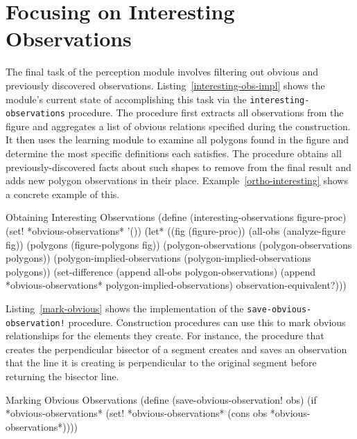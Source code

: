 \section{Focusing on Interesting Observations}

The final task of the perception module involves filtering out obvious
and previously discovered observations.
Listing~\ref{interesting-obs-impl} shows the module's current state of
accomplishing this task via the \texttt{interesting-observations}
procedure. The procedure first extracts all observations from the
figure and aggregates a list of obvious relations specified during the
construction. It then uses the learning module to examine all polygons
found in the figure and determine the most specific definitions each
satisfies. The procedure obtains all previously-discovered facts about
such shapes to remove from the final result and adds new polygon
observations in their place. Example~\ref{ortho-interesting} shows a
concrete example of this.

\begin{code-listing}
[label=interesting-obs-impl]
{Obtaining Interesting Observations}
(define (interesting-observations figure-proc)
  (set! *obvious-observations* '())
  (let* ((fig (figure-proc))
         (all-obs (analyze-figure fig))
         (polygons (figure-polygons fig))
         (polygon-observations (polygon-observations polygons))
         (polygon-implied-observations
           (polygon-implied-observations polygons))
    (set-difference (append all-obs polygon-observations)
                    (append *obvious-observations* polygon-implied-observations)
                    observation-equivalent?)))
\end{code-listing}

Listing~\ref{mark-obvious} shows the implementation of the
\texttt{save-obvious-observation!} procedure. Construction procedures
can use this to mark obvious relationships for the elements they
create. For instance, the procedure that creates the perpendicular
bisector of a segment creates and saves an observation that the line
it is creating is perpendicular to the original segment before
returning the bisector line.

\begin{code-listing}
[label=mark-obvious]
{Marking Obvious Observations}
(define (save-obvious-observation! obs)
  (if *obvious-observations*
      (set! *obvious-observations*
            (cons obs *obvious-observations*))))
\end{code-listing}

